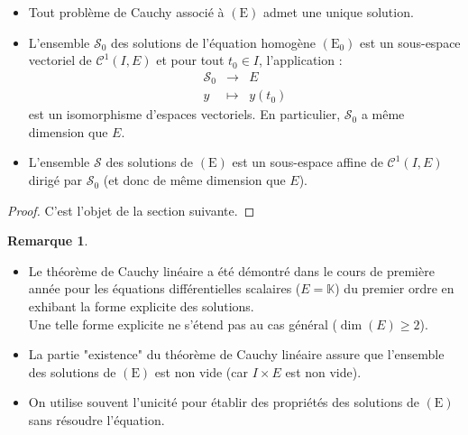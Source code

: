\documentclass[french]{article}
\newcommand{\K}{\mathbb{K}}
\theoremstyle{plain}
\theoremstyle{definition}
\newtheorem*{rmq}{Remarque}
\theoremstyle{remark}
\begin{document}
\begin{thm}%
	\begin{itemize}
		\item Tout problème de Cauchy associé à $(\text{E})$ admet une unique solution.
		\item L'ensemble $\mathcal{S}_0$ des solutions de l'équation homogène $(\text{E}_0)$ est un sous-espace vectoriel de $\mathcal{C}^1(I,E)$ et pour tout $t_0\in I$, l'application :
		$$\begin{array}{rcl}
			\mathcal{S}_0&\longrightarrow& E\\
			y&\longmapsto& y(t_0)
		\end{array}$$ est un isomorphisme d'espaces vectoriels. En particulier, $\mathcal{S}_0$ a même dimension que $E$.
		\item L'ensemble $\mathcal{S}$ des solutions de $(\text{E})$ est un sous-espace affine de $\mathcal{C}^1(I,E)$ dirigé par $\mathcal{S}_0$ (et donc de même dimension que $E$).
	\end{itemize}
\end{thm}
\begin{proof}
	C'est l'objet de la section suivante.
\end{proof}

\begin{rmq}
	\begin{itemize}
		\item Le théorème de Cauchy linéaire a été démontré dans le cours de première année pour les équations différentielles scalaires ($E=\K$) du premier ordre en exhibant la forme explicite des solutions.\\
		Une telle forme explicite ne s'étend pas au cas général ($\dim(E)\geqslant 2$).
		\item La partie "existence" du théorème de Cauchy linéaire assure que l'ensemble des solutions de $(\text{E})$ est non vide (car $I\times E$ est non vide).
		\item On utilise souvent l'unicité pour établir des propriétés des solutions de $(\text{E})$ sans résoudre l'équation.
	\end{itemize}
\end{rmq}
\end{document}

